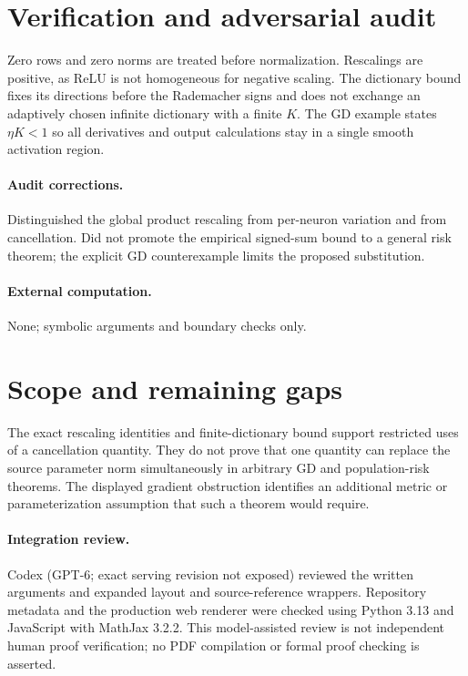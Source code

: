 \documentclass[11pt]{article}
\begin{document}
\section{Verification and adversarial audit}

Zero rows and zero norms are treated before normalization. Rescalings are
positive, as ReLU is not homogeneous for negative scaling. The dictionary
bound fixes its directions before the Rademacher signs and does not exchange
an adaptively chosen infinite dictionary with a finite $K$. The GD example
states $\eta K<1$ so all derivatives and output calculations stay in a single
smooth activation region.

\paragraph{Audit corrections.} Distinguished the global product rescaling from per-neuron variation and
from cancellation. Did not promote the empirical signed-sum bound to a general
risk theorem; the explicit GD counterexample limits the proposed substitution.
\paragraph{External computation.} None; symbolic arguments and boundary checks only.
\section{Scope and remaining gaps}

The exact rescaling identities and finite-dictionary bound support restricted
uses of a cancellation quantity. They do not prove that one quantity can replace
the source parameter norm simultaneously in arbitrary GD and population-risk
theorems. The displayed gradient obstruction identifies an additional metric or
parameterization assumption that such a theorem would require.

\paragraph{Integration review.} Codex (GPT-6; exact serving revision not exposed) reviewed the written arguments and expanded layout and source-reference wrappers. Repository metadata and the production web renderer were checked using Python 3.13 and JavaScript with MathJax 3.2.2. This model-assisted review is not independent human proof verification; no PDF compilation or formal proof checking is asserted.
\end{document}
